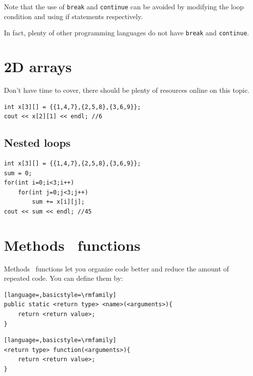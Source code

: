 
Note that the use of \texttt{break} and \texttt{continue} can be avoided by modifying the loop condition and using if statements respectively. 

In fact, plenty of other programming languages do not have \texttt{break} and \texttt{continue}. 

\section{2D arrays}

Don't have time to cover, there should be plenty of resources online on this topic.

\begin{lstlisting}
int x[3][] = {{1,4,7},{2,5,8},{3,6,9}};
cout << x[2][1] << endl; //6
\end{lstlisting}

\subsection{Nested loops}

\begin{lstlisting}
int x[3][] = {{1,4,7},{2,5,8},{3,6,9}};
sum = 0;
for(int i=0;i<3;i++)
    for(int j=0;j<3;j++)
        sum += x[i][j];
cout << sum << endl; //45
\end{lstlisting}

\section{\if{} Methods \else ~functions \fi}
\label{sec:functions}

\if{} Methods \else ~functions \fi let you organize code better and reduce the amount of repeated code. You can define them by:

\if{}
\begin{lstlisting}[language=,basicstyle=\rmfamily]
public static <return type> <name>(<arguments>){
    return <return value>;
}
\end{lstlisting}
\else
\begin{lstlisting}[language=,basicstyle=\rmfamily]
<return type> function(<arguments>){
    return <return value>;
}
\end{lstlisting}
\fi

